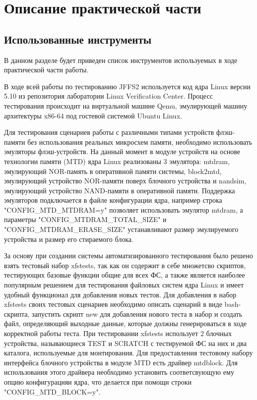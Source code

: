 \section{Описание практической части}
\label{sec:Chapter4} 

\subsection{Использованные инструменты}

В данном разделе будет приведен список инструментов используемых в ходе практической части работы.

В ходе всей работы по тестированию JFFS2 используется код ядра Linux версии 5.10 из репозитория лаборатории Linux Verification Center. Процесс тестирования происходит на виртуальной машине Qemu, эмулирующей машину архитектуры x86-64 под гостевой системой Ubuntu Linux.

Для тестирования сценариев работы с различными типами устройств флэш-памяти без использования реальных микросхем памяти, необходимо использовать эмуляторы флэш-устройств. На данный момент в модуле устройств на основе технологии памяти (MTD) ядра Linux реализованы 3 эмулятора: mtdram, эмулирующий NOR-память в оперативной памяти системы, block2mtd, эмулирующий устройство NOR-памяти поверх блочного устройства и nandsim, эмулирующий устройство NAND-памяти в оперативной памяти. Поддержка эмуляторов подключается в файле конфигурации ядра, например строка "CONFIG\_MTD\_MTDRAM=y"  позволяет использовать эмулятор mtdram, а параметры  "CONFIG\_MTDRAM\_TOTAL\_SIZE"  и  "CONFIG\_MTDRAM\_ERASE\_SIZE"  устанавливают размер эмулируемого устройства и размер его стираемого блока.

За основу при создании системы автоматизированного тестирования было решено взять тестовый набор xfstests, так как он содержит в себе множетсво скриптов, тестирующих базовые функции общие для всех ФС, а также является наиболее популярным решением для тестирования файловых систем ядра Linux и имеет удобный функционал для добавления новых тестов. Для добавления в набор xfstests своих тестовых сценариев необходимо описать сценарий в виде bash-скрипта, запустить скрипт new для добавления нового теста в набор и создать файл, определяющий выходные данные, которые должны генерироваться в ходе корректной работы теста. При тестировании xfstests использует 2 блочных устройства, называющиеся TEST и SCRATCH с тестируемой ФС на них и два каталога, используемые для монтирования. Для предоставления тестовому набору интерфейса блочного устройства в модуле MTD есть драйвер mtdblock. Для использования этого драйвера необходимо установить соответсвующую ему опцию конфигурацияи ядра, что делается при помощи строки  "CONFIG\_MTD\_BLOCK=y".

